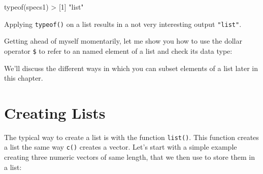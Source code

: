 \documentclass[
]{book}
\newenvironment{Shaded}{\begin{snugshade}}{\end{snugshade}}
\newcommand{\DecValTok}[1]{\textcolor[rgb]{0.00,0.00,0.81}{#1}}
\newcommand{\FunctionTok}[1]{\textcolor[rgb]{0.00,0.00,0.00}{#1}}
\newcommand{\NormalTok}[1]{#1}
\newcommand{\SpecialCharTok}[1]{\textcolor[rgb]{0.00,0.00,0.00}{#1}}
\newcommand{\StringTok}[1]{\textcolor[rgb]{0.31,0.60,0.02}{#1}}
\begin{document}
\begin{Shaded}
\begin{Highlighting}[]
\FunctionTok{typeof}\NormalTok{(specs1)}
\SpecialCharTok{\textgreater{}}\NormalTok{ [}\DecValTok{1}\NormalTok{] }\StringTok{"list"}
\end{Highlighting}
\end{Shaded}

Applying \texttt{typeof()} on a list results in a not very interesting output \texttt{"list"}.

Getting ahead of myself momentarily, let me show you how to use the dollar
operator \texttt{\$} to refer to an named element of a list and check its data type:

\begin{Shaded}
\end{Shaded}

We'll discuss the different ways in which you can subset elements of a list
later in this chapter.

\hypertarget{creating-lists}{%
\section{Creating Lists}\label{creating-lists}}

The typical way to create a list is with the function \texttt{list()}. This function
creates a list the same way \texttt{c()} creates a vector. Let's start with a simple
example creating three numeric vectors of same length, that we then use to
store them in a list:
\end{document}
